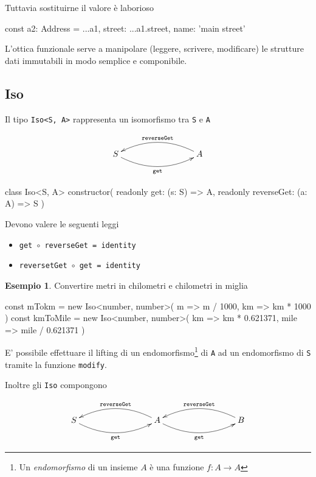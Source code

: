 \documentclass[12pt]{article}
\theoremstyle{definition}
\newtheorem{example}{Esempio}[section]
\newenvironment{code}
  {\vspace{0.5cm} \VerbatimEnvironment\begin{typescriptcode}}
  {\end{typescriptcode} \vspace{0.2cm}}
\begin{document}
Tuttavia sostituirne il valore è laborioso

\begin{code}
const a2: Address = {
  ...a1,
  street: {
    ...a1.street,
    name: 'main street'
  }
}
\end{code}

L'ottica funzionale serve a manipolare (leggere, scrivere, modificare) le strutture dati immutabili in modo semplice e componibile.

\subsection{Iso}

Il tipo \texttt{Iso<S, A>} rappresenta un isomorfismo tra \texttt{S} e \texttt{A}

\[
\xymatrixrowsep{3cm}
\xymatrixcolsep{3cm}
\xymatrix{
  S \ar@/_0.5cm/[r]_{\texttt{get}} & A \ar@/_0.5cm/[l]_{\texttt{reverseGet}}
}
\]

\begin{code}
class Iso<S, A> {
  constructor(
    readonly get: (s: S) => A,
    readonly reverseGet: (a: A) => S
  ) {}
}
\end{code}

Devono valere le seguenti leggi

\begin{itemize}
  \item \texttt{get $\circ$ reverseGet = identity}
  \item \texttt{reversetGet $\circ$ get = identity}
\end{itemize}

\begin{example}

Convertire metri in chilometri e chilometri in miglia

\begin{code}
const mTokm = new Iso<number, number>(
  m => m / 1000,
  km => km * 1000
)
const kmToMile = new Iso<number, number>(
  km => km * 0.621371,
  mile => mile / 0.621371
)
\end{code}
\end{example}

E' possibile effettuare il lifting di un endomorfismo\footnote{Un \emph{endomorfismo} di un insieme $A$ è una funzione $f: A \rightarrow A$}
di \texttt{A} ad un endomorfismo di \texttt{S} tramite la funzione \texttt{modify}.

Inoltre gli \texttt{Iso} compongono

\[
\xymatrixrowsep{3cm}
\xymatrixcolsep{3cm}
\xymatrix{
  S \ar@/_0.5cm/[r]_{\texttt{get}} & A \ar@/_0.5cm/[l]_{\texttt{reverseGet}} \ar@/_0.5cm/[r]_{\texttt{get}} & B \ar@/_0.5cm/[l]_{\texttt{reverseGet}}
}
\]
\end{document}
